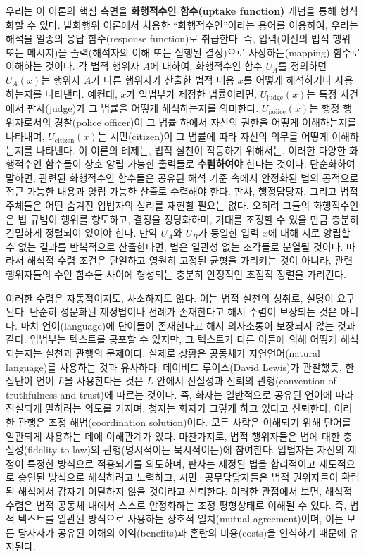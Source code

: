 \documentclass[12pt,a4paper]{article}
\begin{document}
우리는 이 이론의 핵심 측면을 \textbf{화행적수인 함수(uptake function)}
개념을 통해 형식화할 수 있다. 발화행위 이론에서 차용한
``화행적수인''이라는 용어를 이용하여, 우리는 해석을 일종의 \textsf{응답
함수(response function)}로 취급한다. 즉, 입력(이전의 법적 행위 또는
메시지)을 출력(해석자의 이해 또는 실행된 결정)으로 사상하는(mapping)
함수로 이해하는 것이다. 각 법적 행위자 \(A\)에 대하여, 화행적수인 함수
\(U_A\)를 정의하면 \(U_A(x)\)는 행위자 \(A\)가 다른 행위자가 산출한 법적
내용 \(x\)를 어떻게 해석하거나 사용하는지를 나타낸다. 예컨대, \(x\)가
입법부가 제정한 법률이라면, \(U_{\text{judge}}(x)\)는 특정 사건에서
판사(judge)가 그 법률을 어떻게 해석하는지를 의미한다.
\(U_{\text{police}}(x)\)는 행정 행위자로서의 경찰(police officer)이 그
법률 하에서 자신의 권한을 어떻게 이해하는지를 나타내며,
\(U_{\text{citizen}}(x)\)는 시민(citizen)이 그 법률에 따라 자신의 의무를
어떻게 이해하는지를 나타낸다. 이 이론의 테제는, 법적 실천이 작동하기
위해서는, 이러한 다양한 화행적수인 함수들이 상호 양립 가능한 출력들로
\textbf{수렴하여야} 한다는 것이다. 단순화하여 말하면, 관련된 화행적수인
함수들은 공유된 해석 기준 속에서 안정화된 법의 공적으로 접근 가능한
내용과 양립 가능한 산출로 수렴해야 한다. 판사, 행정담당자, 그리고 법적
주체들은 어떤 숨겨진 입법자의 심리를 재현할 필요는 없다. 오히려 그들의
화행적수인은 법 규범이 행위를 향도하고, 결정을 정당화하며, 기대를 조정할
수 있을 만큼 충분히 긴밀하게 정렬되어 있어야 한다. 만약 \(U_A\)와
\(U_B\)가 동일한 입력 \(x\)에 대해 서로 양립할 수 없는 결과를 반복적으로
산출한다면, 법은 일관성 없는 조각들로 분열될 것이다. 따라서 해석적 수렴
조건은 단일하고 영원히 고정된 균형을 가리키는 것이 아니라, 관련
행위자들의 수인 함수들 사이에 형성되는 충분히 안정적인 초점적 정렬을
가리킨다.

이러한 수렴은 자동적이지도, 사소하지도 않다. 이는 법적 실천의 성취로,
설명이 요구된다. 단순히 성문화된 제정법이나 선례가 존재한다고 해서
수렴이 보장되는 것은 아니다. 마치 언어(language)에 단어들이 존재한다고
해서 의사소통이 보장되지 않는 것과 같다. 입법부는 텍스트를 공포할 수
있지만, 그 텍스트가 다른 이들에 의해 어떻게 해석되는지는 실천과 관행의
문제이다. 실제로 상황은 공동체가 자연언어(natural language)를 사용하는
것과 유사하다. 데이비드 루이스(David Lewis)가 관찰했듯, 한 집단이 언어
\(L\)을 사용한다는 것은 \(L\) 안에서 진실성과 신뢰의 관행(convention of
truthfulness and trust)에 따르는 것이다. 즉, 화자는 일반적으로 공유된
언어에 따라 진실되게 말하려는 의도를 가지며, 청자는 화자가 그렇게 하고
있다고 신뢰한다\autocite{Lewis1969}. 이러한 관행은 조정 해법(coordination
solution)이다. 모든 사람은 이해되기 위해 단어를 일관되게 사용하는 데에
이해관계가 있다\autocite{Lewis1975}. 마찬가지로, 법적 행위자들은 법에 대한
충실성(fidelity to law)의 관행(명시적이든 묵시적이든)에 참여한다.
입법자는 자신의 제정이 특정한 방식으로 적용되기를 의도하며, 판사는
제정된 법을 합리적이고 제도적으로 승인된 방식으로 해석하려고 노력하고,
시민·공무담당자들은 법적 권위자들이 확립된 해석에서 갑자기 이탈하지 않을
것이라고 신뢰한다. 이러한 관점에서 보면, \textsf{해석적 수렴}은 법적
공동체 내에서 스스로 안정화하는 조정 평형상태로 이해될 수 있다. 즉, 법적
텍스트를 일관된 방식으로 사용하는 상호적 일치(mutual agreement)이며,
이는 모든 당사자가 공유된 이해의 이익(benefits)과 혼란의 비용(costs)을
인식하기 때문에 유지된다.
\end{document}
